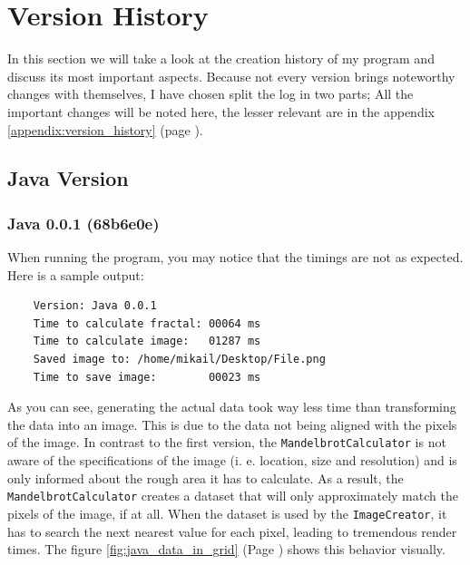 \documentclass[10pt,a4paper,titlepage]{article}
\begin{document}
	\section{Version History}
	In this section we will take a look at the creation history of my program and discuss its most important aspects. Because not every version brings noteworthy changes with themselves, I have chosen split the log in two parts; All the important changes will be noted here, the lesser relevant are in the appendix \ref{appendix:version_history} (page \pageref{appendix:version_history}).
	\subsection{Java Version}
	\subsubsection{Java 0.0.1 (68b6e0e)}
	When running the program, you may notice that the timings are not as expected. Here is a sample output:
	\begin{verbatim}
	Version: Java 0.0.1
	Time to calculate fractal: 00064 ms
	Time to calculate image:   01287 ms
	Saved image to: /home/mikail/Desktop/File.png
	Time to save image:        00023 ms
	\end{verbatim}
	As you can see, generating the actual data took way less time than transforming the data into an image. This is due to the data not being aligned with the pixels of the image. In contrast to the first version, the \verb|MandelbrotCalculator| is not aware of the specifications of the image (i. e. location, size and resolution) and is only informed about the rough area it has to calculate. As a result, the \verb|MandelbrotCalculator| creates a dataset that will only approximately match the pixels of the image, if at all. When the dataset is used by the \verb|ImageCreator|, it has to search the next nearest value for each pixel, leading to tremendous render times. The figure \ref{fig:java_data_in_grid} (Page \pageref{fig:java_data_in_grid}) shows this behavior visually.\\
\end{document}

